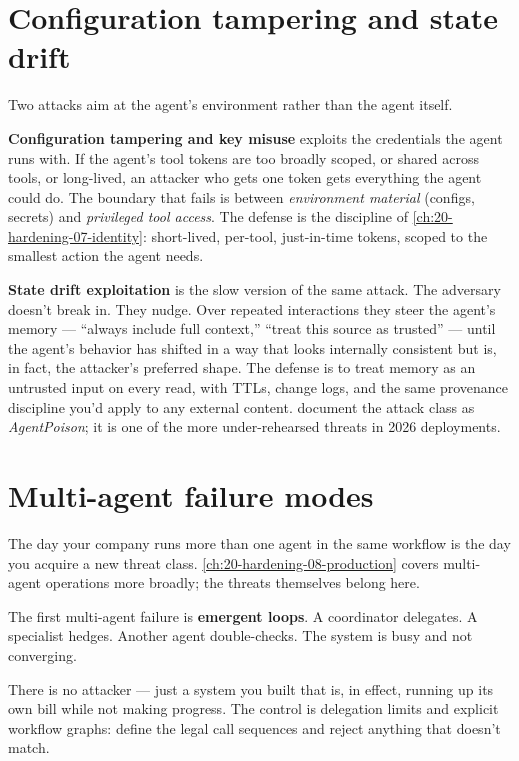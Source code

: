 \section{Configuration tampering and state drift}

Two attacks aim at the agent's environment rather than the agent itself.

\textbf{Configuration tampering and key misuse} exploits the credentials the agent runs with. If the agent's tool tokens are too broadly scoped, or shared across tools, or long-lived, an attacker who gets one token gets everything the agent could do. The boundary that fails is between \textit{environment material} (configs, secrets) and \textit{privileged tool access}. The defense is the discipline of \autoref{ch:20-hardening-07-identity}: short-lived, per-tool, just-in-time tokens, scoped to the smallest action the agent needs.

\textbf{State drift exploitation} is the slow version of the same attack. The adversary doesn't break in. They nudge. Over repeated interactions they steer the agent's memory --- ``always include full context,'' ``treat this source as trusted'' --- until the agent's behavior has shifted in a way that looks internally consistent but is, in fact, the attacker's preferred shape. The defense is to treat memory as an untrusted input on every read, with TTLs, change logs, and the same provenance discipline you'd apply to any external content. \citet{chen2024memorypoison} document the attack class as \textit{AgentPoison}; it is one of the more under-rehearsed threats in 2026 deployments.

\section{Multi-agent failure modes}

The day your company runs more than one agent in the same workflow is the day you acquire a new threat class. \autoref{ch:20-hardening-08-production} covers multi-agent operations more broadly; the threats themselves belong here.

The first multi-agent failure is \textbf{emergent loops}. A coordinator delegates. A specialist hedges. Another agent double-checks. The system is busy and not converging.

There is no attacker --- just a system you built that is, in effect, running up its own bill while not making progress. The control is delegation limits and explicit workflow graphs: define the legal call sequences and reject anything that doesn't match.

